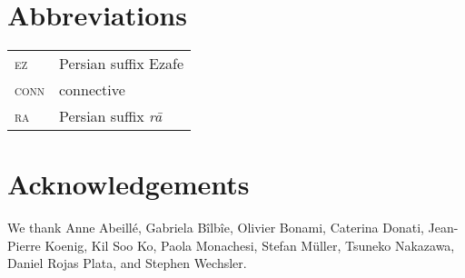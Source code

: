 {} %

\section*{Abbreviations}


\begin{tabularx}{.99\textwidth}{@{}lX}
\textsc{ez} & Persian suffix Ezafe \\
\textsc{conn} & connective\\
\textsc{ra} & Persian suffix \emph{rā}\\
\end{tabularx}




\section*{Acknowledgements}

We thank Anne Abeill\'e, Gabriela B\^ilb\^ie, Olivier Bonami, Caterina Donati, Jean-Pierre Koenig, Kil Soo Ko, Paola Monachesi, Stefan Müller, Tsuneko Nakazawa, Daniel Rojas Plata, and Stephen Wechsler. 

{\sloppy
	\printbibliography[heading=subbibliography,notkeyword=this]
}


